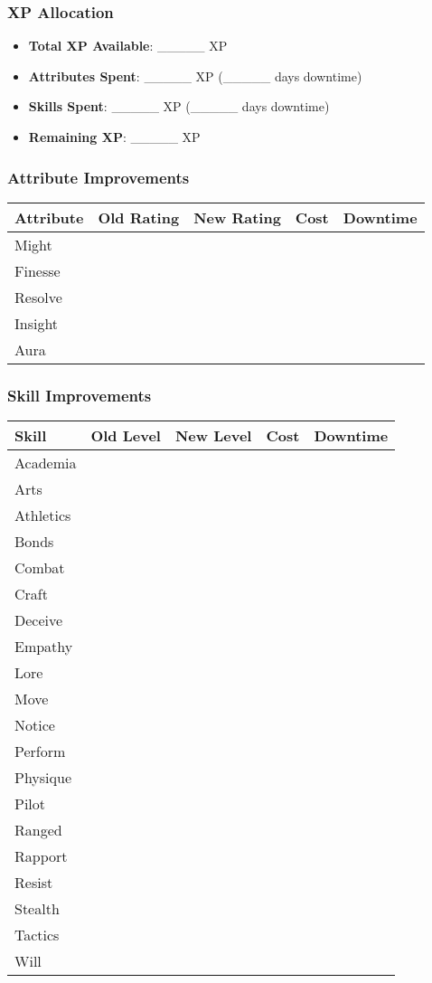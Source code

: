 \subsubsection{XP Allocation}
\begin{itemize}
    \item \textbf{Total XP Available}: \_\_\_\_\_ XP
    \item \textbf{Attributes Spent}: \_\_\_\_\_ XP (\_\_\_\_\_ days downtime)
    \item \textbf{Skills Spent}: \_\_\_\_\_ XP (\_\_\_\_\_ days downtime)
    \item \textbf{Remaining XP}: \_\_\_\_\_ XP
\end{itemize}

\subsubsection{Attribute Improvements}
\begin{tabular}{|p{3cm}|c|c|c|c|}
\hline
\textbf{Attribute} & \textbf{Old Rating} & \textbf{New Rating} & \textbf{Cost} & \textbf{Downtime} \\
\hline
Might & & & & \\
Finesse & & & & \\
Resolve & & & & \\
Insight & & & & \\
Aura & & & & \\
\hline
\end{tabular}

\subsubsection{Skill Improvements}
\begin{tabular}{|p{4cm}|c|c|c|c|}
\hline
\textbf{Skill} & \textbf{Old Level} & \textbf{New Level} & \textbf{Cost} & \textbf{Downtime} \\
\hline
Academia & & & & \\
Arts & & & & \\
Athletics & & & & \\
Bonds & & & & \\
Combat & & & & \\
Craft & & & & \\
Deceive & & & & \\
Empathy & & & & \\
Lore & & & & \\
Move & & & & \\
Notice & & & & \\
Perform & & & & \\
Physique & & & & \\
Pilot & & & & \\
Ranged & & & & \\
Rapport & & & & \\
Resist & & & & \\
Stealth & & & & \\
Tactics & & & & \\
Will & & & & \\
\hline
\end{tabular}

